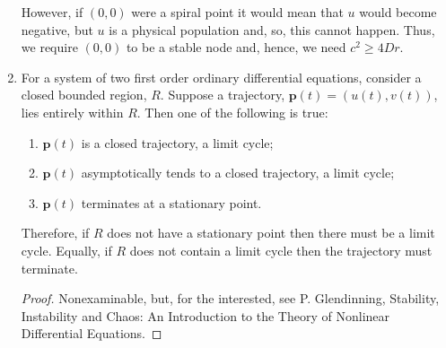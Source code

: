 \begin{example}[frametitle=Fisher waves in Fisher's Equation]
\begin{enumerate}
{However, if $(0,0)$ were a spiral point it would mean that $u$ would become negative, but $u$ is a physical population and, so, this cannot happen. Thus, we require $(0,0)$ to be a stable node and, hence, we need $c^2\geq 4Dr$.}

\item {}
\begin{thm}
For a system of two first order ordinary differential equations, consider a closed bounded
region, $R$. Suppose a trajectory, $\bm{p}(t)=(u(t),v(t))$, lies entirely within $R$. Then one of the
following is true:
\begin{enumerate}
\item $\bm{p}(t)$ is a closed trajectory, \eg a limit cycle;
\item $\bm{p}(t)$ asymptotically tends to a closed trajectory, \eg a limit cycle;
\item $\bm{p}(t)$ terminates at a stationary point.
\end{enumerate}
Therefore, if $R$ does not have a stationary point then there must be a limit cycle. Equally, if $R$ does not contain a limit cycle then the trajectory must terminate.
\end{thm}
\begin{proof}
Nonexaminable, but, for the interested, see P. Glendinning, Stability, Instability and Chaos: An Introduction to the Theory of Nonlinear Differential Equations.
\end{proof}


\end{enumerate}
\end{example}
